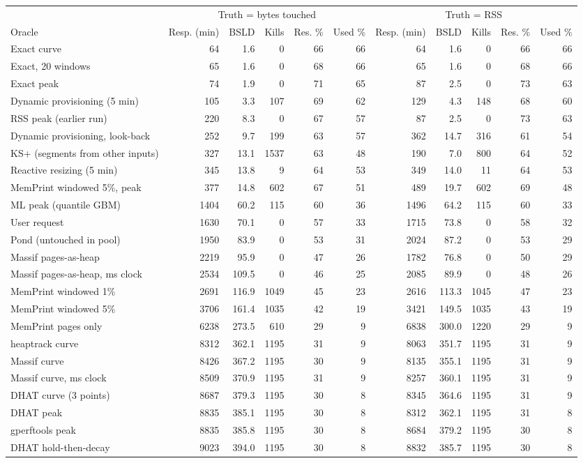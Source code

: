 \begin{tabular}{lrrrrrrrrrr}
\toprule
 & \multicolumn{5}{c}{Truth = bytes touched} & \multicolumn{5}{c}{Truth = RSS} \\
\cmidrule(lr){2-6} \cmidrule(lr){7-11}
Oracle & Resp. (min) & BSLD & Kills & Res. \% & Used \% & Resp. (min) & BSLD & Kills & Res. \% & Used \% \\
\midrule
Exact curve & 64 & 1.6 & 0 & 66 & 66 & 64 & 1.6 & 0 & 66 & 66 \\
Exact, 20 windows & 65 & 1.6 & 0 & 68 & 66 & 65 & 1.6 & 0 & 68 & 66 \\
Exact peak & 74 & 1.9 & 0 & 71 & 65 & 87 & 2.5 & 0 & 73 & 63 \\
Dynamic provisioning (5 min) & 105 & 3.3 & 107 & 69 & 62 & 129 & 4.3 & 148 & 68 & 60 \\
RSS peak (earlier run) & 220 & 8.3 & 0 & 67 & 57 & 87 & 2.5 & 0 & 73 & 63 \\
Dynamic provisioning, look-back & 252 & 9.7 & 199 & 63 & 57 & 362 & 14.7 & 316 & 61 & 54 \\
KS+ (segments from other inputs) & 327 & 13.1 & 1537 & 63 & 48 & 190 & 7.0 & 800 & 64 & 52 \\
Reactive resizing (5 min) & 345 & 13.8 & 9 & 64 & 53 & 349 & 14.0 & 11 & 64 & 53 \\
MemPrint windowed 5\%, peak & 377 & 14.8 & 602 & 67 & 51 & 489 & 19.7 & 602 & 69 & 48 \\
ML peak (quantile GBM) & 1404 & 60.2 & 115 & 60 & 36 & 1496 & 64.2 & 115 & 60 & 33 \\
User request & 1630 & 70.1 & 0 & 57 & 33 & 1715 & 73.8 & 0 & 58 & 32 \\
Pond (untouched in pool) & 1950 & 83.9 & 0 & 53 & 31 & 2024 & 87.2 & 0 & 53 & 29 \\
Massif pages-as-heap & 2219 & 95.9 & 0 & 47 & 26 & 1782 & 76.8 & 0 & 50 & 29 \\
Massif pages-as-heap, ms clock & 2534 & 109.5 & 0 & 46 & 25 & 2085 & 89.9 & 0 & 48 & 26 \\
MemPrint windowed 1\% & 2691 & 116.9 & 1049 & 45 & 23 & 2616 & 113.3 & 1045 & 47 & 23 \\
MemPrint windowed 5\% & 3706 & 161.4 & 1035 & 42 & 19 & 3421 & 149.5 & 1035 & 43 & 19 \\
MemPrint pages only & 6238 & 273.5 & 610 & 29 & 9 & 6838 & 300.0 & 1220 & 29 & 9 \\
heaptrack curve & 8312 & 362.1 & 1195 & 31 & 9 & 8063 & 351.7 & 1195 & 31 & 9 \\
Massif curve & 8426 & 367.2 & 1195 & 30 & 9 & 8135 & 355.1 & 1195 & 31 & 9 \\
Massif curve, ms clock & 8509 & 370.9 & 1195 & 31 & 9 & 8257 & 360.1 & 1195 & 31 & 9 \\
DHAT curve (3 points) & 8687 & 379.3 & 1195 & 30 & 8 & 8345 & 364.6 & 1195 & 31 & 9 \\
DHAT peak & 8835 & 385.1 & 1195 & 30 & 8 & 8312 & 362.1 & 1195 & 31 & 8 \\
gperftools peak & 8835 & 385.8 & 1195 & 30 & 8 & 8684 & 379.2 & 1195 & 30 & 8 \\
DHAT hold-then-decay & 9023 & 394.0 & 1195 & 30 & 8 & 8832 & 385.7 & 1195 & 30 & 8 \\
\bottomrule
\end{tabular}
